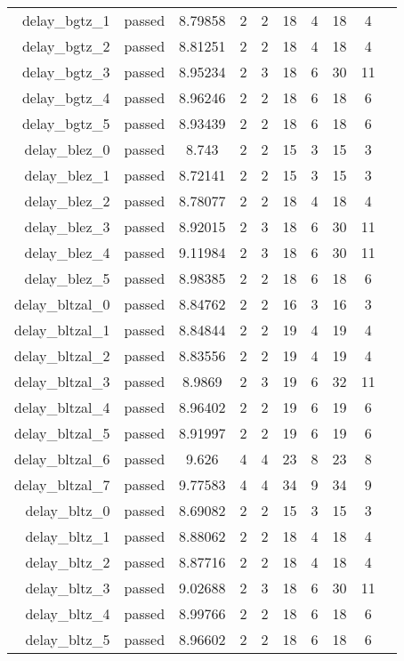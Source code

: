 \begin{longtable}{r|ccccccccc}
    delay\_bgtz\_1 & passed & 8.79858 & 2 & 2 & 18 & 4 & 18 & 4 \\
    delay\_bgtz\_2 & passed & 8.81251 & 2 & 2 & 18 & 4 & 18 & 4 \\
    delay\_bgtz\_3 & passed & 8.95234 & 2 & 3 & 18 & 6 & 30 & 11 \\
    delay\_bgtz\_4 & passed & 8.96246 & 2 & 2 & 18 & 6 & 18 & 6 \\
    delay\_bgtz\_5 & passed & 8.93439 & 2 & 2 & 18 & 6 & 18 & 6 \\
    delay\_blez\_0 & passed & 8.743 & 2 & 2 & 15 & 3 & 15 & 3 \\
    delay\_blez\_1 & passed & 8.72141 & 2 & 2 & 15 & 3 & 15 & 3 \\
    delay\_blez\_2 & passed & 8.78077 & 2 & 2 & 18 & 4 & 18 & 4 \\
    delay\_blez\_3 & passed & 8.92015 & 2 & 3 & 18 & 6 & 30 & 11 \\
    delay\_blez\_4 & passed & 9.11984 & 2 & 3 & 18 & 6 & 30 & 11 \\
    delay\_blez\_5 & passed & 8.98385 & 2 & 2 & 18 & 6 & 18 & 6 \\
    delay\_bltzal\_0 & passed & 8.84762 & 2 & 2 & 16 & 3 & 16 & 3 \\
    delay\_bltzal\_1 & passed & 8.84844 & 2 & 2 & 19 & 4 & 19 & 4 \\
    delay\_bltzal\_2 & passed & 8.83556 & 2 & 2 & 19 & 4 & 19 & 4 \\
    delay\_bltzal\_3 & passed & 8.9869 & 2 & 3 & 19 & 6 & 32 & 11 \\
    delay\_bltzal\_4 & passed & 8.96402 & 2 & 2 & 19 & 6 & 19 & 6 \\
    delay\_bltzal\_5 & passed & 8.91997 & 2 & 2 & 19 & 6 & 19 & 6 \\
    delay\_bltzal\_6 & passed & 9.626 & 4 & 4 & 23 & 8 & 23 & 8 \\
    delay\_bltzal\_7 & passed & 9.77583 & 4 & 4 & 34 & 9 & 34 & 9 \\
    delay\_bltz\_0 & passed & 8.69082 & 2 & 2 & 15 & 3 & 15 & 3 \\
    delay\_bltz\_1 & passed & 8.88062 & 2 & 2 & 18 & 4 & 18 & 4 \\
    delay\_bltz\_2 & passed & 8.87716 & 2 & 2 & 18 & 4 & 18 & 4 \\
    delay\_bltz\_3 & passed & 9.02688 & 2 & 3 & 18 & 6 & 30 & 11 \\
    delay\_bltz\_4 & passed & 8.99766 & 2 & 2 & 18 & 6 & 18 & 6 \\
    delay\_bltz\_5 & passed & 8.96602 & 2 & 2 & 18 & 6 & 18 & 6 \\

\end{longtable}
